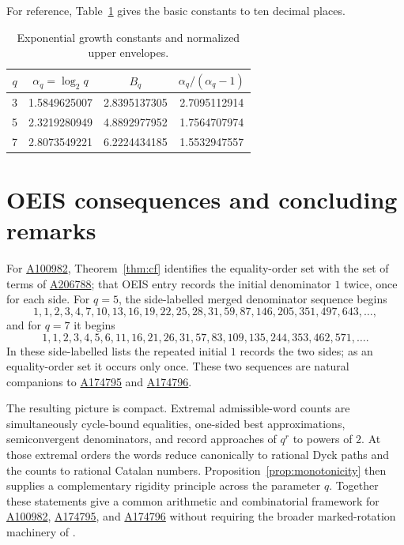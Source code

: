 \documentclass[11pt]{article}
\newcommand{\OEIS}[1]{\href{https://oeis.org/#1}{#1}}
\begin{document}
For reference, Table~\ref{tab:threeq} gives the basic constants to ten
decimal places.

\begin{table}[ht]
\centering
\small
\renewcommand{\arraystretch}{1.15}
\begin{tabular}{c c c c}
\toprule
\(q\) & \(\alpha_q=\log_2q\) & \(B_q\) &
\(\alpha_q/(\alpha_q-1)\)\\
\midrule
3 & 1.5849625007 & 2.8395137305 & 2.7095112914\\
5 & 2.3219280949 & 4.8892977952 & 1.7564707974\\
7 & 2.8073549221 & 6.2224434185 & 1.5532947557\\
\bottomrule
\end{tabular}
\caption{Exponential growth constants and normalized upper envelopes.}
\label{tab:threeq}
\end{table}

\section{OEIS consequences and concluding remarks}
\label{sec:conclusion}

For \OEIS{A100982}, Theorem~\ref{thm:cf} identifies the equality-order
set with the set of terms of \OEIS{A206788}; that OEIS entry records the
initial denominator \(1\) twice, once for each side. For \(q=5\), the
side-labelled merged denominator
sequence begins
\[
 1,1,2,3,4,7,10,13,16,19,22,25,28,31,59,87,146,205,351,497,643,\ldots,
\]
and for \(q=7\) it begins
\[
 1,1,2,3,4,5,6,11,16,21,26,31,57,83,109,135,244,353,462,571,\ldots.
\]
In these side-labelled lists the repeated initial \(1\) records the two
sides; as an equality-order set it occurs only once. These two sequences
are natural companions to
\OEIS{A174795} and \OEIS{A174796}.

The resulting picture is compact. Extremal admissible-word counts are
simultaneously cycle-bound equalities, one-sided best approximations,
semiconvergent denominators, and record approaches of \(q^r\) to powers of
\(2\). At those extremal orders the words reduce canonically to rational
Dyck paths and the counts to rational Catalan numbers. Proposition~\ref{prop:monotonicity}
then supplies a complementary rigidity principle across the parameter
\(q\). Together these statements give a common arithmetic and combinatorial
framework for \OEIS{A100982}, \OEIS{A174795}, and \OEIS{A174796} without
requiring the broader marked-rotation machinery of \cite{WinBeatty}.
\end{document}
